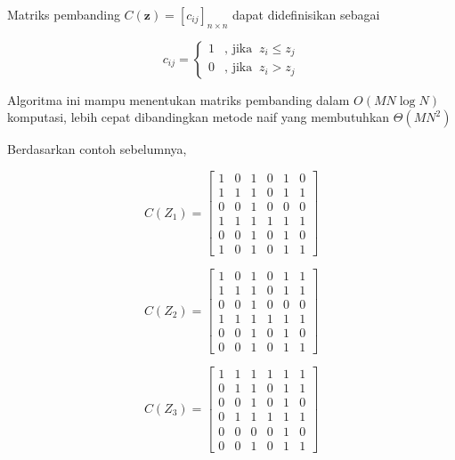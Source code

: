 Matriks pembanding $C(\mathbf{z}) = [c_{ij}]_{n \times n}$ dapat didefinisikan sebagai 

\begin{equation}
  c_{ij} = 
  \begin{cases}
    1 & \text{, jika $\ z_i \leq z_j$} \\
    0 & \text{, jika $\ z_i \gt z_j$}
  \end{cases}
\end{equation}

Algoritma ini mampu menentukan matriks pembanding dalam $O(MN\log N)$ komputasi, lebih cepat dibandingkan metode naif yang membutuhkan $\Theta(MN^2)$ 

Berdasarkan contoh sebelumnya,

\begin{equation}
  C(Z_1) = 
  \begin{bmatrix}
    1 & 0 & 1 & 0 & 1 & 0 \\
    1 & 1 & 1 & 0 & 1 & 1 \\
    0 & 0 & 1 & 0 & 0 & 0 \\
    1 & 1 & 1 & 1 & 1 & 1 \\
    0 & 0 & 1 & 0 & 1 & 0 \\
    1 & 0 & 1 & 0 & 1 & 1
  \end{bmatrix} 
\end{equation}

\begin{equation}
  C(Z_2) =
  \begin{bmatrix}
    1 & 0 & 1 & 0 & 1 & 1 \\
    1 & 1 & 1 & 0 & 1 & 1 \\
    0 & 0 & 1 & 0 & 0 & 0 \\
    1 & 1 & 1 & 1 & 1 & 1 \\
    0 & 0 & 1 & 0 & 1 & 0 \\
    0 & 0 & 1 & 0 & 1 & 1
  \end{bmatrix}
\end{equation}

\begin{equation}
  C(Z_3) =
  \begin{bmatrix}
    1 & 1 & 1 & 1 & 1 & 1 \\
    0 & 1 & 1 & 0 & 1 & 1 \\
    0 & 0 & 1 & 0 & 1 & 0 \\
    0 & 1 & 1 & 1 & 1 & 1 \\
    0 & 0 & 0 & 0 & 1 & 0 \\
    0 & 0 & 1 & 0 & 1 & 1
  \end{bmatrix}
\end{equation}

